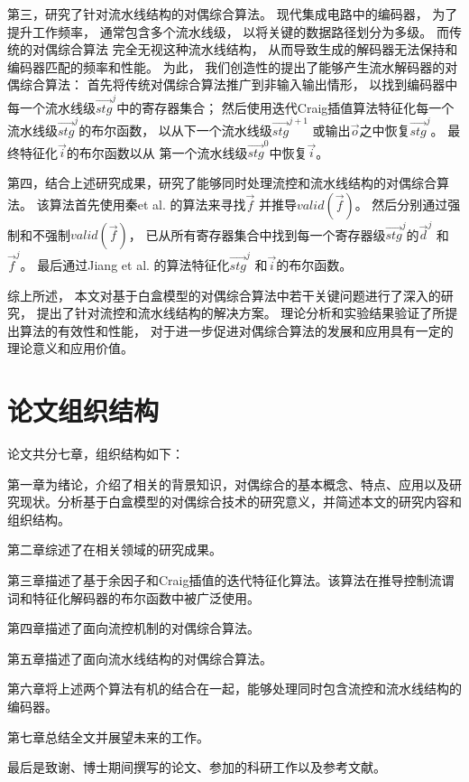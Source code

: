 第三，研究了针对流水线结构的对偶综合算法。
现代集成电路中的编码器，
为了提升工作频率，
通常包含多个流水线级，
以将关键的数据路径划分为多级。
而传统的对偶综合算法
完全无视这种流水线结构，
从而导致生成的解码器无法保持和编码器匹配的频率和性能。
为此，
我们创造性的提出了能够产生流水解码器的对偶综合算法：
首先将传统对偶综合算法推广到非输入输出情形，
以找到编码器中每一个流水线级$\vec{stg}^j$中的寄存器集合；
然后使用迭代Craig插值算法特征化每一个流水线级$\vec{stg}^j$的布尔函数，
以从下一个流水线级$\vec{stg}^{j+1}$ 或输出$\vec{o}$之中恢复$\vec{stg}^j$。
最终特征化$\vec{i}$的布尔函数以从
第一个流水线级$\vec{stg}^0$中恢复$\vec{i}$。

第四，结合上述研究成果，研究了能够同时处理流控和流水线结构的对偶综合算法。
该算法首先使用秦et al. \cite{QinTODAES15}的算法来寻找$\vec{f}$ 并推导$valid(\vec{f})$。
然后分别通过强制和不强制$valid(\vec{f})$，
已从所有寄存器集合中找到每一个寄存器级$\vec{stg}^j$的$\vec{d}^j$ 和$\vec{f}^j$。
最后通过Jiang et al. \cite{InterpBoolFunction}的算法特征化$\vec{stg}^j$ 和$\vec{i}$的布尔函数。

综上所述，
本文对基于白盒模型的对偶综合算法中若干关键问题进行了深入的研究，
提出了针对流控和流水线结构的解决方案。
理论分析和实验结果验证了所提出算法的有效性和性能，
对于进一步促进对偶综合算法的发展和应用具有一定的理论意义和应用价值。

\section{论文组织结构}
论文共分七章，组织结构如下：

第一章为绪论，介绍了相关的背景知识，对偶综合的基本概念、特点、应用以及研究现状。分析基于白盒模型的对偶综合技术的研究意义，并简述本文的研究内容和组织结构。

第二章综述了在相关领域的研究成果。

第三章描述了基于余因子和Craig插值的迭代特征化算法。该算法在推导控制流谓词和特征化解码器的布尔函数中被广泛使用。

第四章描述了面向流控机制的对偶综合算法。

第五章描述了面向流水线结构的对偶综合算法。

第六章将上述两个算法有机的结合在一起，能够处理同时包含流控和流水线结构的编码器。

第七章总结全文并展望未来的工作。

最后是致谢、博士期间撰写的论文、参加的科研工作以及参考文献。
